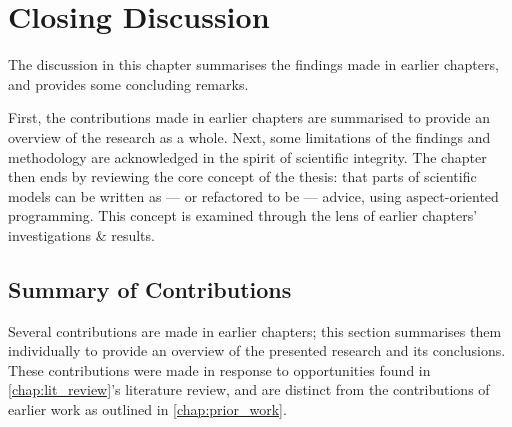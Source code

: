 \chapter{Closing Discussion}\label{chap:closing_discussion}

The discussion in this chapter summarises the findings made in earlier
chapters, and provides some concluding remarks.

First, the contributions made in earlier chapters are summarised to provide an
overview of the research as a whole. Next, some limitations of the findings and
methodology are acknowledged in the spirit of scientific integrity. The chapter
then ends by reviewing the core concept of the thesis: that parts of scientific
models can be written as --- or refactored to be --- advice, using
aspect-oriented programming. This concept is examined through the lens of
earlier chapters' investigations \& results.




\section{Summary of Contributions}
\label{conclusion:contributions}

Several contributions are made in earlier chapters; this section summarises them
individually to provide an overview of the presented research and its
conclusions. These contributions were made in response to opportunities found in
\cref{chap:lit_review}'s literature review, and are distinct from
the contributions of earlier work as outlined in \cref{chap:prior_work}.

